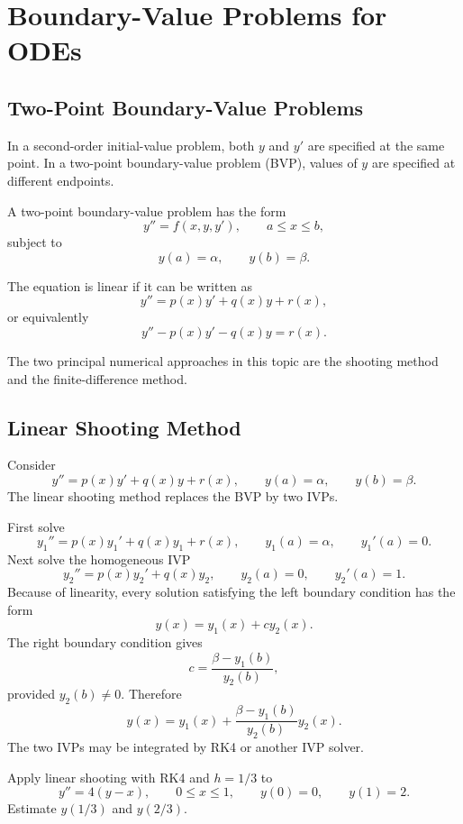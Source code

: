 \chapter{Boundary-Value Problems for ODEs}

\section{Two-Point Boundary-Value Problems}

In a second-order initial-value problem, both $y$ and $y'$ are specified at the same point.  In a two-point boundary-value problem (BVP), values of $y$ are specified at different endpoints.

\begin{definition}
A two-point boundary-value problem has the form
\[
 y''=f(x,y,y'),
 \qquad a\le x\le b,
\]
subject to
\[
 y(a)=\alpha,
 \qquad
 y(b)=\beta.
\]
\end{definition}

\begin{definition}
The equation is linear if it can be written as
\[
 y''=p(x)y'+q(x)y+r(x),
\]
or equivalently
\[
 y''-p(x)y'-q(x)y=r(x).
\]
\end{definition}

The two principal numerical approaches in this topic are the shooting method and the finite-difference method.

\section{Linear Shooting Method}

Consider
\[
 y''=p(x)y'+q(x)y+r(x),
 \qquad
 y(a)=\alpha,
 \qquad
 y(b)=\beta.
\]
The linear shooting method replaces the BVP by two IVPs.

First solve
\[
 y_1''=p(x)y_1'+q(x)y_1+r(x),
 \qquad
 y_1(a)=\alpha,
 \qquad
 y_1'(a)=0.
\]
Next solve the homogeneous IVP
\[
 y_2''=p(x)y_2'+q(x)y_2,
 \qquad
 y_2(a)=0,
 \qquad
 y_2'(a)=1.
\]
Because of linearity, every solution satisfying the left boundary condition has the form
\[
 y(x)=y_1(x)+cy_2(x).
\]
The right boundary condition gives
\[
 c=\frac{\beta-y_1(b)}{y_2(b)},
\]
provided $y_2(b)\ne0$.  Therefore
\[
 \boxed{
 y(x)=y_1(x)+
 \frac{\beta-y_1(b)}{y_2(b)}y_2(x)
 }.
\]
The two IVPs may be integrated by RK4 or another IVP solver.

\begin{example}
Apply linear shooting with RK4 and $h=1/3$ to
\[
 y''=4(y-x),
 \qquad0\le x\le1,
 \qquad y(0)=0,
 \qquad y(1)=2.
\]
Estimate $y(1/3)$ and $y(2/3)$.
\end{example}

